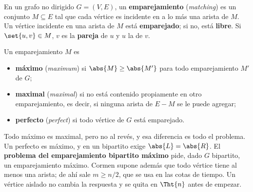 \documentclass[11pt,letterpaper]{article}
\begin{document}
\begin{definicion}[Emparejamiento]
  \label{def:emparejamiento}
  En un grafo no dirigido $G = (V, E)$, un \textbf{emparejamiento}
  (\textit{matching}) es un conjunto $M \subseteq E$ tal que cada
  vértice es incidente en a lo más una arista de $M$. Un vértice
  incidente en una arista de $M$ está \textbf{emparejado}; si no,
  está \textbf{libre}. Si $\set{u, v} \in M$, $v$ es la
  \textbf{pareja} de $u$ y $u$ la de $v$.
\end{definicion}

\begin{definicion}
  \label{def:emparejamiento-maximo}
  Un emparejamiento $M$ es
  \begin{itemize}
    \item \textbf{máximo} (\textit{maximum}) si
      $\abs{M} \ge \abs{M'}$ para todo emparejamiento $M'$ de $G$;
    \item \textbf{maximal} (\textit{maximal}) si no está contenido
      propiamente en otro emparejamiento, es decir, si ninguna arista
      de $E - M$ se le puede agregar;
    \item \textbf{perfecto} (\textit{perfect}) si todo vértice de $G$
      está emparejado.
  \end{itemize}
\end{definicion}

Todo máximo es maximal, pero no al revés, y esa diferencia es todo
el problema. Un perfecto es máximo, y en un bipartito exige
$\abs{L} = \abs{R}$. El \textbf{problema del emparejamiento
bipartito máximo} pide, dado $G$ bipartito, un emparejamiento máximo.
Cormen supone además que todo vértice tiene al menos una arista; de
ahí sale $m \ge n/2$, que se usa en las cotas de tiempo. Un vértice
aislado no cambia la respuesta y se quita en $\Tht{n}$ antes de
empezar.
\end{document}
